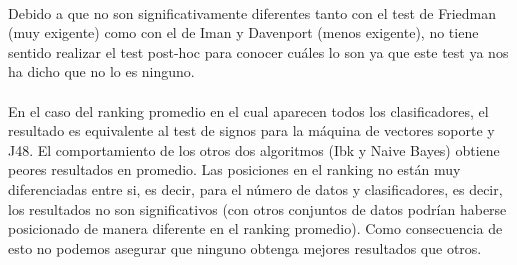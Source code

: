 \documentclass[10pt, a4paper,spanish]{article}
\begin{document}
		\paragraph{}
		Debido a que no son significativamente diferentes tanto con el test de Friedman (muy exigente) como con el de Iman y Davenport (menos exigente), no tiene sentido realizar el test post-hoc para conocer cuáles lo son ya que este test ya nos ha dicho que no lo es ninguno.

		\paragraph{}
		En el caso del ranking promedio en el cual aparecen todos los clasificadores, el resultado es equivalente al test de signos para la máquina de vectores soporte y J48. El comportamiento de los otros dos algoritmos (Ibk y Naive Bayes) obtiene peores resultados en promedio. Las posiciones en el ranking no están muy diferenciadas entre si, es decir, para el número de datos y clasificadores, es decir, los resultados no son significativos (con otros conjuntos de datos podrían haberse posicionado de manera diferente en el ranking promedio). Como consecuencia de esto no podemos asegurar que ninguno obtenga mejores resultados que otros.
\end{document}
